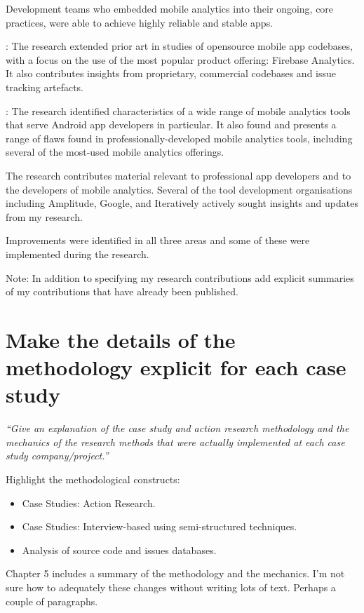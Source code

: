 Development teams who embedded mobile analytics into their ongoing, core practices, were able to achieve highly reliable and stable apps. 

: 
The research extended prior art in studies of opensource mobile app codebases, with a focus on the use of the most popular product offering: Firebase Analytics. It also contributes insights from proprietary, commercial codebases and issue tracking artefacts.

:
The research identified characteristics of a wide range of mobile analytics tools that serve Android app developers in particular. It also found and  presents a range of flaws found in professionally-developed mobile analytics tools, including several of the most-used mobile analytics offerings.

The research contributes material relevant to professional app developers and to the developers of mobile analytics. Several of the tool development organisations including Amplitude, Google, and Iteratively actively sought insights and updates from my research.

Improvements were identified in all three areas and some of these were implemented during the research. 

Note: In addition to specifying my research contributions add explicit summaries of my contributions that have already been published.


\section{Make the details of the methodology explicit for each case study}
\emph{``Give an explanation of the case study and action research methodology and the mechanics of the research methods that were actually implemented at each case study company/project.''}

Highlight the methodological constructs:
\begin{itemize}
    \item Case Studies: Action Research.
    \item Case Studies: Interview-based using semi-structured techniques.
    \item Analysis of source code and issues databases.
\end{itemize}

Chapter 5 includes a summary of the methodology and the mechanics. I'm not sure how to adequately these changes without writing lots of text. Perhaps a couple of paragraphs.

